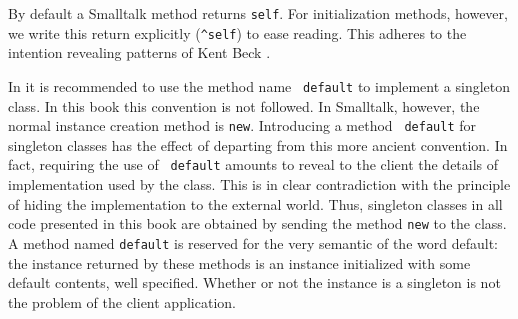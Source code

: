 \documentclass[twoside]{book}
\begin{document}
By default a Smalltalk method returns {\tt self}. For
initialization methods, however, we write this return explicitly
({\tt \^\/self}) to ease reading. This adheres to the intention
revealing patterns of Kent Beck \cite{Beck}.

In \cite{StDesPat} it is recommended to use the method name {\tt
default} to implement a singleton class. In this book this
convention is not followed. In Smalltalk, however, the normal
instance creation method is {\tt new}. Introducing a method {\tt
default} for singleton classes has the effect of departing from
this more ancient convention. In fact, requiring the use of {\tt
default} amounts to reveal to the client the details of
implementation used by the class. This is in clear contradiction
with the principle of hiding the implementation to the external
world. Thus, singleton classes in all code presented in this book
are obtained by sending the method {\tt new} to the class. A
method named {\tt default} is reserved for the very semantic of
the word default: the instance returned by these methods is an
instance initialized with some default contents, well specified.
Whether or not the instance is a singleton is not the problem of
the client application.
\end{document}
